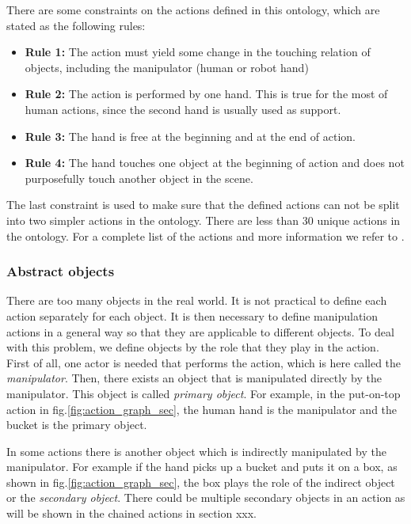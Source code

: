 There are some constraints on the actions defined in this ontology, which are stated as the following rules:
\begin{itemize}
 \item \textbf{Rule 1:} The action must yield some change in the touching relation of objects, including the manipulator (human or robot hand)
 \item \textbf{Rule 2:} The action is performed by one hand. This is true for the most of human actions, since the second hand is usually used as support.
 \item \textbf{Rule 3:} The hand is free at the beginning and at the end of action.
 \item \textbf{Rule 4:} The hand touches one object at the beginning of action and does not purposefully touch another object in the scene.
\end{itemize}

The last constraint is used to make sure that the defined actions can not be split into two simpler actions in the ontology.
There are less than 30 unique actions in the ontology.
For a complete list of the actions and more information we refer to \cite{TAMD13}.

\subsubsection{Abstract objects}

There are too many objects in the real world.
It is not practical to define each action separately for each object.
It is then necessary to define manipulation actions in a general way so that they are applicable to different objects.
To deal with this problem, we define objects by the role that they play in the action.
First of all, one actor is needed that performs the action, which is here called the \textit{manipulator}.
Then, there exists an object that is manipulated directly by the manipulator.
This object is called \textit{primary object}.
For example, in the put-on-top action in fig.\ref{fig:action_graph_sec}, the human hand is the manipulator and the bucket is the primary object.

In some actions there is another object which is indirectly manipulated by the manipulator.
For example if the hand picks up a bucket and puts it on a box, as shown in fig.\ref{fig:action_graph_sec},
the box plays the role of the indirect object or the \textit{secondary object}.
There could be multiple secondary objects in an action as will be shown in the chained actions in section xxx.

